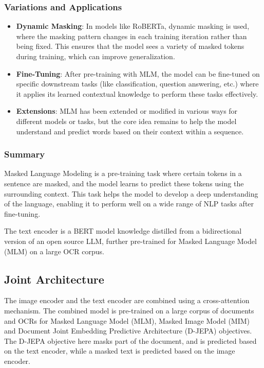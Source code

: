 \documentclass{article} %
\begin{document}
\subsubsection{Variations and Applications}
\begin{itemize}
    \item \textbf{Dynamic Masking}: In models like RoBERTa, dynamic masking is used, where the masking pattern changes in each training iteration rather than being fixed. This ensures that the model sees a variety of masked tokens during training, which can improve generalization.
    \item \textbf{Fine-Tuning}: After pre-training with MLM, the model can be fine-tuned on specific downstream tasks (like classification, question answering, etc.) where it applies its learned contextual knowledge to perform these tasks effectively.
    \item \textbf{Extensions}: MLM has been extended or modified in various ways for different models or tasks, but the core idea remains to help the model understand and predict words based on their context within a sequence.
\end{itemize}

\subsubsection{Summary}
Masked Language Modeling is a pre-training task where certain tokens in a sentence are masked, and the model learns to predict these tokens using the surrounding context. This task helps the model to develop a deep understanding of the language, enabling it to perform well on a wide range of NLP tasks after fine-tuning.


The text encoder is a BERT model knowledge distilled from a bidirectional version of an open source LLM, further pre-trained for Masked Language Model (MLM) on a large OCR corpus. 

\subsection{Joint Architecture}
The image encoder and the text encoder are combined using a cross-attention mechanism. The combined model is pre-trained on a large corpus of documents and OCRs for Masked Language Model (MLM), Masked Image Model (MIM) and Document Joint Embedding Predictive Architecture (D-JEPA) objectives. The D-JEPA objective here masks part of the document, and is predicted based on the text encoder, while a masked text is predicted based on the image encoder. 
\end{document}
